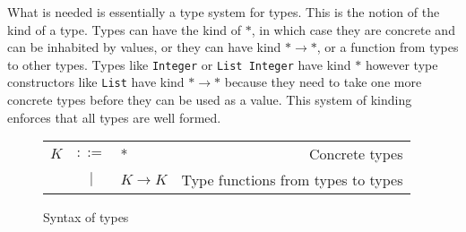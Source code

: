 What is needed is essentially a type system for types. This is the notion of
the kind of a type. Types can have the kind of $ * $, in which case
they are concrete and can be inhabited by values, or they can have kind
$ * \rightarrow * $, or a function from types to other types. Types like
\lstinline{Integer} or \lstinline{List Integer} have kind $ * $ however
type constructors like \lstinline{List} have kind 
$ * \rightarrow * $ because they need to take one more concrete
types before they can be used as a value. This system of kinding enforces that
all types are well formed.

\begin{figure}[H]\label{fig:kinds}
    \centering
    \begin{tabular}{l c p{3cm} r}
        $ K $ & $ ::= $ & * &                   Concrete types \\
      & $ | $ & $ K \rightarrow K $ &           Type functions from types to types \\
    \end{tabular}
    \caption{Syntax of types}
\end{figure}


